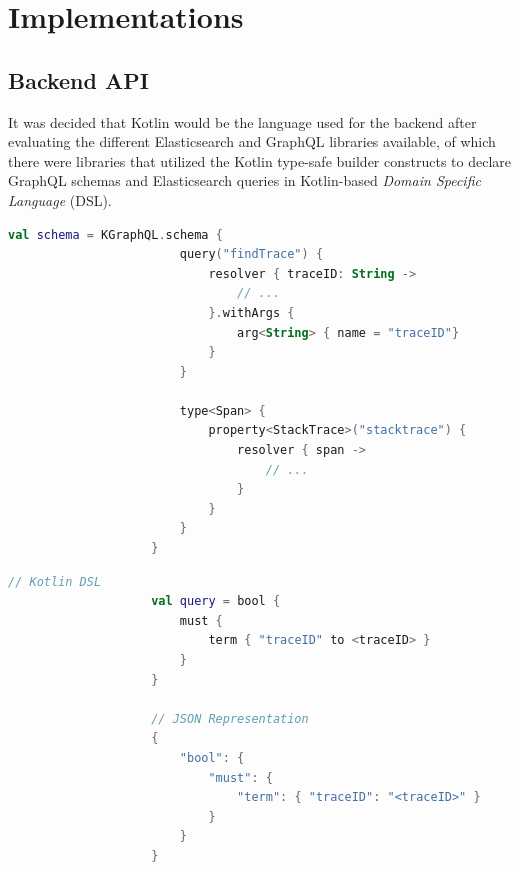 \documentclass[12pt,pdftex,titlepage]{report}
\begin{document}
        \newpage          
        \section{Implementations}    
            \subsection{Backend API}
                It was decided that Kotlin would be the language used for the backend after evaluating the different Elasticsearch and GraphQL libraries available, of which there were libraries 
                that utilized the Kotlin type-safe builder constructs\cite{dsl} to declare GraphQL schemas and Elasticsearch queries in Kotlin-based \textit{Domain Specific Language} (DSL).

                \begin{lstlisting}[caption=Kotlin snippet of defining the GraphQL schema using the Kotlin DSL., language=Kotlin, gobble=20]
                    val schema = KGraphQL.schema { 
                        query("findTrace") { 
                            resolver { traceID: String ->
                                // ...
                            }.withArgs { 
                                arg<String> { name = "traceID"}
                            }
                        }

                        type<Span> {
                            property<StackTrace>("stacktrace") { 
                                resolver { span ->
                                    // ...
                                }
                            }
                        }
                    }                
                \end{lstlisting}

                \medskip
                \begin{lstlisting}[caption={Comparison between Elasticsearch query using Kotlin DSL and the query in its JSON representation, where $\langle$traceID$\rangle$ refers
                    to a variable storing the trace identifier.}, language=Kotlin, gobble=20]
                    // Kotlin DSL
                    val query = bool {
                        must {
                            term { "traceID" to <traceID> }
                        }
                    }

                    // JSON Representation
                    {
                        "bool": {
                            "must": {
                                "term": { "traceID": "<traceID>" }
                            }
                        }
                    }
                \end{lstlisting}
\end{document}
